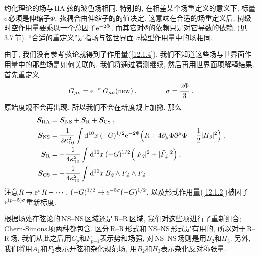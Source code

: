 约化理论的场与\,IIA\,弦的玻色场相同. 特别的, 在相差某个场重定义的意义下, 标量$ \sigma $必须是伸缩子$ \Phi$. 弦耦合由伸缩子的的值决定. 这意味在合适的场重定义后, 树级时空作用量要乘以一个总因子$ \mathrm{e}^{-2\Phi}$, 而其它对$ \Phi $的依赖只是对它导数的依赖, (见\,3.7\,节). ``合适的重定义''是指场与弦世界面 $\sigma $模型作用量中的场相同.

由于, 我们没有参考弦论就得到了作用量(\ref{12.1.4}), 我们不知道这些场与世界面作用量中的那些场是如何关联的. 我们将通过猜测继续, 然后再用世界面项解释结果. 首先重定义
\begin{equation}
    G_{\mu\nu}=\mathrm{e}^{-\sigma}\,G_{\mu\nu}(\text{new})\:, \qquad \qquad \sigma=\frac{2\Phi}{3}\:.\label{12.1.9}
\end{equation}
原始度规不会再出现, 所以我们不会在新度规上加撇. 那么
\begin{subequations}
    \begin{align}
        \bm{S}_{\text{IIA}} &= \bm{S}_{\text{NS}}+ \bm{S}_{\text{R}}+\bm{S}_{\text{CS}} \:, \label{12.1.10a} \\
        \bm{S}_{\text{NS}} &= \frac{1}{2\kappa_{10}^{2}}\int \mathrm{d}^{10}x\:(-G)^{1/2}\mathrm{e}^{-2\Phi}\Bigl(R+4\partial_{\mu}\Phi\partial^{\mu}\Phi-\frac{1}{2}\lvert H_{\textit{3}}\rvert^{2} \Bigr) \:,  \label{12.1.10b} \\
        \bm{S}_{\text{R}}&=-\frac{1}{4\kappa_{10}^{2}}\int\mathrm{d}^{10}x\:(-G)^{1/2}\Bigl(\lvert F_{\textit{2}}\rvert^{2}+\lvert \tilde{F}_{\textit{4}}\rvert^{2}\Bigr) \:, \label{12.1.10c}\\
        \bm{S}_{\text{CS}}&=-\frac{1}{4\kappa_{10}^{2}}\int\mathrm{d}^{10}x\:B_{\textit{2}}\wedge
        F_{\textit{4}}\wedge F_{\textit{4}} \:. \label{12.1.10d}
    \end{align} \label{12.1.10}
\end{subequations}
注意$ R\to \mathrm{e}^{\sigma}R+\cdots$, $(-G)^{1/2}\to \mathrm{e}^{-5\sigma}(-G)^{1/2}$, 以及形式作用量(\ref{12.1.2})被因子$  \mathrm{e}^{(p-5)\sigma} $重新标度.

根据场处在弦论的\,NS--NS\,区域还是\,R--R\,区域, 我们对这些项进行了重新组合; Chern-Simons\,项两种都包含. 区分\,R--R\,形式和\,NS--NS\,形式是有用的, 所以对于\,R--R\,场, 我们从此之后用$ C_{\textit{p}} $和$ F_{\textit{p+1}} $表示势和场强, 对\,NS--NS\,场则是用$ B_{\textit{2}} $和$ H_{\textit{3}}$. 另外, 我们将用$ A_{\textit{1}} $和$ F_{\textit{2}} $表示开弦和杂化规范场, 用$ B_{\textit{2}} $和$ H_{\textit{3}} $表示杂化反对称张量.


